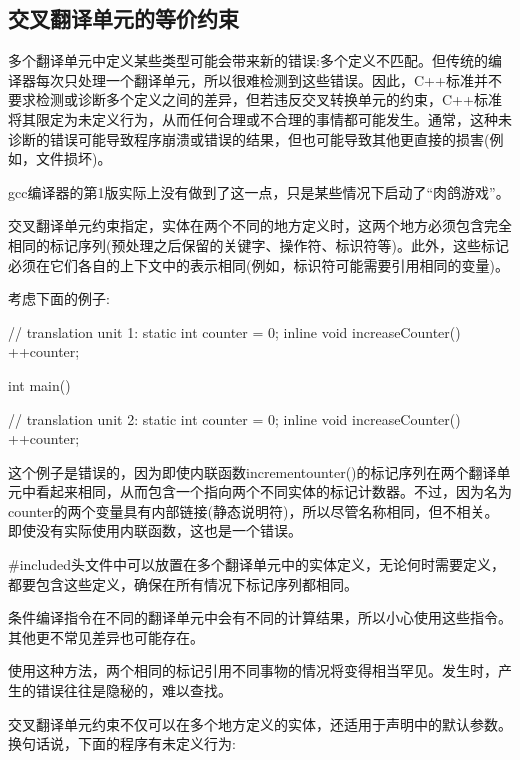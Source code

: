 \subsection{交叉翻译单元的等价约束}

多个翻译单元中定义某些类型可能会带来新的错误:多个定义不匹配。但传统的编译器每次只处理一个翻译单元，所以很难检测到这些错误。因此，C++标准并不要求检测或诊断多个定义之间的差异，但若违反交叉转换单元的约束，C++标准将其限定为未定义行为，从而任何合理或不合理的事情都可能发生。通常，这种未诊断的错误可能导致程序崩溃或错误的结果，但也可能导致其他更直接的损害(例如，文件损坏)。

\begin{notice}
gcc编译器的第1版实际上没有做到了这一点，只是某些情况下启动了“肉鸽游戏”。
\end{notice}

交叉翻译单元约束指定，实体在两个不同的地方定义时，这两个地方必须包含完全相同的标记序列(预处理之后保留的关键字、操作符、标识符等)。此外，这些标记必须在它们各自的上下文中的表示相同(例如，标识符可能需要引用相同的变量)。

考虑下面的例子:

\begin{cpp}
// translation unit 1:
static int counter = 0;
inline void increaseCounter()
{
	++counter;
}

int main()
{ }

// translation unit 2:
static int counter = 0;
inline void increaseCounter()
{
	++counter;
}
\end{cpp}

这个例子是错误的，因为即使内联函数incrementounter()的标记序列在两个翻译单元中看起来相同，从而包含一个指向两个不同实体的标记计数器。不过，因为名为counter的两个变量具有内部链接(静态说明符)，所以尽管名称相同，但不相关。即使没有实际使用内联函数，这也是一个错误。

\#included头文件中可以放置在多个翻译单元中的实体定义，无论何时需要定义，都要包含这些定义，确保在所有情况下标记序列都相同。

\begin{notice}
条件编译指令在不同的翻译单元中会有不同的计算结果，所以小心使用这些指令。其他更不常见差异也可能存在。
\end{notice}

使用这种方法，两个相同的标记引用不同事物的情况将变得相当罕见。发生时，产生的错误往往是隐秘的，难以查找。

交叉翻译单元约束不仅可以在多个地方定义的实体，还适用于声明中的默认参数。换句话说，下面的程序有未定义行为:

